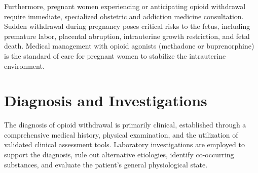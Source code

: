 Furthermore, pregnant women experiencing or anticipating opioid withdrawal require immediate, specialized obstetric and addiction medicine consultation. Sudden withdrawal during pregnancy poses critical risks to the fetus, including premature labor, placental abruption, intrauterine growth restriction, and fetal death. Medical management with opioid agonists (methadone or buprenorphine) is the standard of care for pregnant women to stabilize the intrauterine environment.

\section*{Diagnosis and Investigations}
The diagnosis of opioid withdrawal is primarily clinical, established through a comprehensive medical history, physical examination, and the utilization of validated clinical assessment tools. Laboratory investigations are employed to support the diagnosis, rule out alternative etiologies, identify co-occurring substances, and evaluate the patient's general physiological state.

